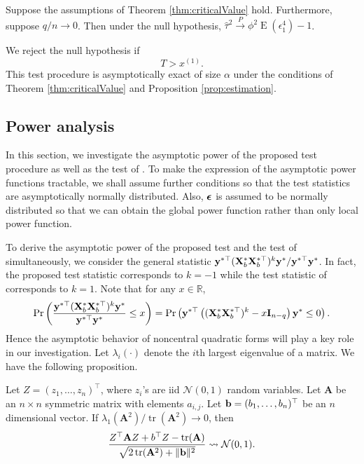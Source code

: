 \documentclass[smallextended]{svjour3}       %
\DeclareMathOperator{\mytr}{tr}
\DeclareMathOperator{\myE}{E}
\newcommand{\By}{\mathbf{y}}    \newcommand{\Bz}{\mathbf{z}}
\newcommand{\BA}{\mathbf{A}}    \newcommand{\BB}{\mathbf{B}}    \newcommand{\BC}{\mathbf{C}}    \newcommand{\BD}{\mathbf{D}}    \newcommand{\BE}{\mathbf{E}}    \newcommand{\BF}{\mathbf{F}}    \newcommand{\BG}{\mathbf{G}}    \newcommand{\BH}{\mathbf{H}}    \newcommand{\BI}{\mathbf{I}}    \newcommand{\BJ}{\mathbf{J}}    \newcommand{\BK}{\mathbf{K}}    \newcommand{\BL}{\mathbf{L}}
\begin{document}
\begin{proposition}\label{prop:estimation}
    Suppose the assumptions of Theorem \ref{thm:criticalValue} hold.
    Furthermore, suppose $q/n\to 0$.
    Then under the null hypothesis, $\hat \tau^2 \xrightarrow{P} \phi^{2} \myE (\epsilon_1^4)-1$.
\end{proposition}
We reject the null hypothesis if 
\begin{equation*}
    T > x^{(1)}.
\end{equation*}
This test procedure is asymptotically exact of size $\alpha$ under the conditions of Theorem \ref{thm:criticalValue} and Proposition \ref{prop:estimation}.


\subsection{Power analysis}\label{sec:Power}
In this section, we investigate the asymptotic power of the proposed test procedure as well as the test of \cite{Goeman2006}.
To make the expression of the asymptotic power functions tractable, we shall assume further conditions so that the test statistics are asymptotically normally distributed.
Also, $\boldsymbol{\epsilon}$ is assumed to be normally distributed so that we can obtain the global power function rather than only local power function.

To derive the asymptotic power of the proposed test and the test of \cite{Goeman2006} simultaneously, we consider the general statistic
    ${
\By^{*\top}
    (\BX_b^* \BX_b^{*\top})^{k} 
        \By^*
    }/{\By^{*\top} \By^*}$.
    In fact, the proposed test statistic corresponds to $k=-1$ while the test statistic of \cite{Goeman2006} corresponds to $k=1$.
    Note that for any $x\in \mathbb R$,
    \begin{equation*}
        \Pr\left( 
    \frac{
\By^{*\top}
    (\BX_b^* \BX_b^{*\top})^{k} 
        \By^*
    }{\By^{*\top} \By^*}
    \leq x
        \right)
        =
        \Pr\left( 
\By^{*\top}
\left( 
    (\BX_b^* \BX_b^{*\top})^{k} 
    -x\BI_{n-q}
\right)
        \By^*
    \leq 
    0
\right).
    \end{equation*}
Hence the asymptotic behavior of noncentral quadratic forms will play a key role in our investigation.
Let $\lambda_i ( \cdot )$ denote the $i$th largest eigenvalue of a matrix.
We have the following proposition.
\begin{proposition}
    Let $Z=(z_1,\ldots, z_n)^\top$, where $z_i$'s are iid $\mathcal N(0,1)$ random variables.
    Let $\BA$ be an $n\times n$ symmetric matrix with elements $a_{i,j}$.
    Let $\mathbf{b}=(b_1,\ldots, b_n)^\top$ be an $n$ dimensional vector.
    If $\lambda_1(\BA^2)/\mytr (\BA^2)\to 0$,
    then
    \begin{equation*}
        \frac{Z^\top \BA Z + b^\top Z - \mytr(\BA)}{\sqrt{2\mytr(\BA^2)+\|\Bb\|^2}}
        \rightsquigarrow \mathcal N(0,1).
    \end{equation*}
    \label{Lemma:normal}
\end{proposition}
\end{document}
